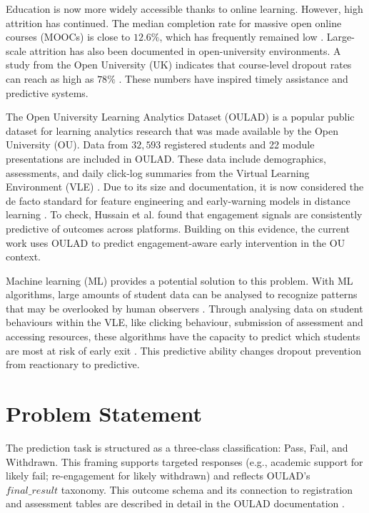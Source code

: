 \documentclass[ %
                    author={Carlos Duran Calle},
                supervisor={Dr. Felipe Campelo},
                    degree={MSc},
                     title={Comparative Machine Learning Analysis for Student Dropout Prediction in a Virtual Learning Environment},
                  subtitle={Incorporating Student Engagement and Socio-Economic Features},
                      type={},
                      year={2025}]{dissertation}
\begin{document}
\noindent
Education is now more widely accessible thanks to online learning.  However, high attrition has continued.  The median completion rate for massive open online courses (MOOCs) is close to $12.6\%$, which has frequently remained low \cite{jordan_massive_2015}.  Large-scale attrition has also been documented in open-university environments.  A study from the Open University (UK) indicates that course-level dropout rates can reach as high as $78\%$ \cite{simpson_can_we_do_better}.  These numbers have inspired timely assistance and predictive systems.

The Open University Learning Analytics Dataset (OULAD) is a popular public dataset for learning analytics research that was made available by the Open University (OU).  Data from $32,593$ registered students and 22 module presentations are included in OULAD. These data include demographics, assessments, and daily click-log summaries from the Virtual Learning Environment (VLE) \cite{kuzilek_OULAD_2017}.  Due to its size and documentation, it is now considered the de facto standard for feature engineering and early-warning models in distance learning \cite{kuzilek_OULAD_2017}.  To check, Hussain et al. \cite{hussain_student_engagement_prediction_2018} found that engagement signals are consistently predictive of outcomes across platforms.  Building on this evidence, the current work uses OULAD to predict engagement-aware early intervention in the OU context.

Machine learning (ML) provides a potential solution to this problem. With ML algorithms, large amounts of student data can be analysed to recognize patterns that may be overlooked by human observers \cite{holland_ML_1992}. Through analysing data on student behaviours within the VLE, like clicking behaviour, submission of assessment and accessing resources, these algorithms have the capacity to predict which students are most at risk of early exit \cite{baker_educational_2014}. This predictive ability changes dropout prevention from reactionary to predictive.

\section{Problem Statement}
The prediction task is structured as a three-class classification: Pass, Fail, and Withdrawn.  This framing supports targeted responses (e.g., academic support for likely fail; re-engagement for likely withdrawn) and reflects OULAD's $final\_result$ taxonomy.  This outcome schema and its connection to registration and assessment tables are described in detail in the OULAD documentation \cite{kuzilek_OULAD_2017}. 
\end{document}
